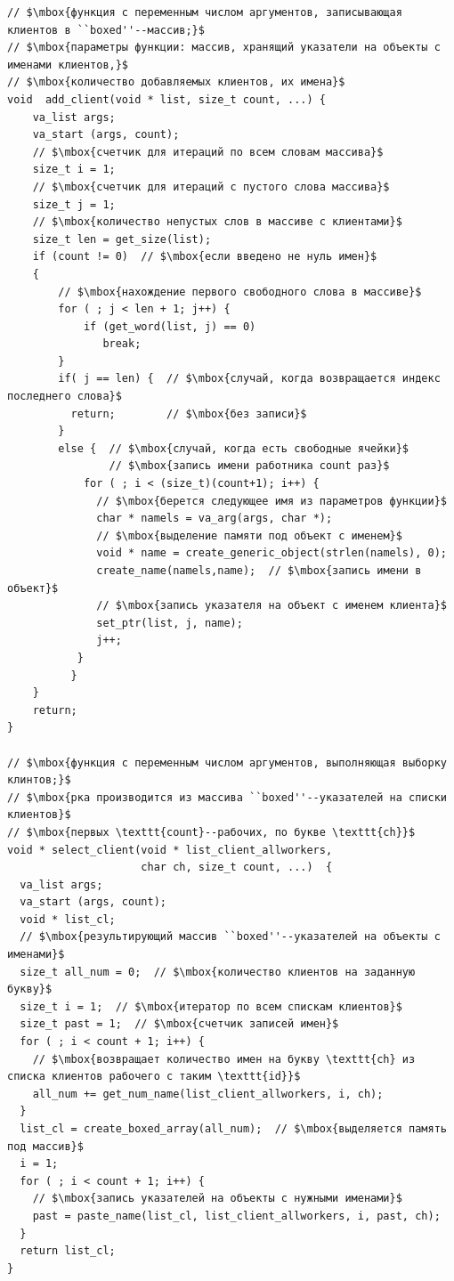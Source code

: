 \begin{lstlisting}[mathescape]
// $\mbox{функция с переменным числом аргументов, записывающая клиентов в ``boxed''--массив;}$
// $\mbox{параметры функции: массив, хранящий указатели на объекты с именами клиентов,}$
// $\mbox{количество добавляемых клиентов, их имена}$
void  add_client(void * list, size_t count, ...) {
    va_list args;
    va_start (args, count);
    // $\mbox{счетчик для итераций по всем словам массива}$
    size_t i = 1;
    // $\mbox{счетчик для итераций с пустого слова массива}$
    size_t j = 1;
    // $\mbox{количество непустых слов в массиве с клиентами}$
    size_t len = get_size(list);
    if (count != 0)  // $\mbox{если введено не нуль имен}$
    {
        // $\mbox{нахождение первого свободного слова в массиве}$
        for ( ; j < len + 1; j++) { 
            if (get_word(list, j) == 0)
               break;
        }
        if( j == len) {  // $\mbox{случай, когда возвращается индекс последнего слова}$
          return;        // $\mbox{без записи}$
        }
        else {  // $\mbox{случай, когда есть свободные ячейки}$
                // $\mbox{запись имени работника count раз}$
            for ( ; i < (size_t)(count+1); i++) {
              // $\mbox{берется следующее имя из параметров функции}$
              char * namels = va_arg(args, char *);
              // $\mbox{выделение памяти под объект с именем}$
              void * name = create_generic_object(strlen(namels), 0);  
              create_name(namels,name);  // $\mbox{запись имени в объект}$
              // $\mbox{запись указателя на объект с именем клиента}$
              set_ptr(list, j, name);
              j++;
           }
          }
    }
    return;
}

// $\mbox{функция с переменным числом аргументов, выполняющая выборку клинтов;}$
// $\mbox{рка производится из массива ``boxed''--указателей на списки клиентов}$
// $\mbox{первых \texttt{count}--рабочих, по букве \texttt{ch}}$
void * select_client(void * list_client_allworkers,
                     char ch, size_t count, ...)  {  
  va_list args;
  va_start (args, count);
  void * list_cl;  
  // $\mbox{результирующий массив ``boxed''--указателей на объекты с именами}$
  size_t all_num = 0;  // $\mbox{количество клиентов на заданную букву}$
  size_t i = 1;  // $\mbox{итератор по всем спискам клиентов}$
  size_t past = 1;  // $\mbox{счетчик записей имен}$
  for ( ; i < count + 1; i++) {
    // $\mbox{возвращает количество имен на букву \texttt{ch} из списка клиентов рабочего с таким \texttt{id}}$
    all_num += get_num_name(list_client_allworkers, i, ch);   
  }
  list_cl = create_boxed_array(all_num);  // $\mbox{выделяется память под массив}$
  i = 1;
  for ( ; i < count + 1; i++) {
    // $\mbox{запись указателей на объекты с нужными именами}$
    past = paste_name(list_cl, list_client_allworkers, i, past, ch);
  }
  return list_cl;
}


\end{lstlisting}
